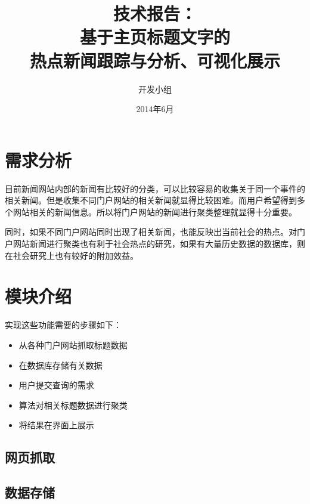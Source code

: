 \documentclass[12pt]{article}
\begin{document}
\title{技术报告：\\[3ex] 基于主页标题文字的\\热点新闻跟踪与分析、可视化展示\\[3ex]}

\author{开发小组}

\date{2014年6月}
\maketitle
\newpage
\renewcommand{\contentsname}{技术报告}
\tableofcontents
\newpage
\section{需求分析}
目前新闻网站内部的新闻有比较好的分类，可以比较容易的收集关于同一个事件的相关新闻。但是收集不同门户网站的相关新闻就显得比较困难。而用户希望得到多个网站相关的新闻信息。所以将门户网站的新闻进行聚类整理就显得十分重要。

同时，如果不同门户网站同时出现了相关新闻，也能反映出当前社会的热点。对门户网站新闻进行聚类也有利于社会热点的研究，如果有大量历史数据的数据库，则在社会研究上也有较好的附加效益。

\section{模块介绍}
实现这些功能需要的步骤如下：
\begin{itemize}
\item 从各种门户网站抓取标题数据
\item 在数据库存储有关数据
\item 用户提交查询的需求
\item 算法对相关标题数据进行聚类
\item 将结果在界面上展示
\end{itemize}

\subsection{网页抓取}


\subsection{数据存储}

\end{document}
